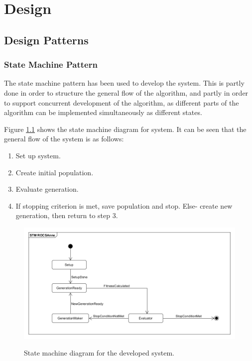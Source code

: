 
\chapter{Design}
\section{Design Patterns}
\subsection{State Machine Pattern}
The state machine pattern has been used to develop the system. This is partly done in order to structure the general flow of the algorithm, and partly in order to support concurrent development of the algorithm, as different parts of the algorithm can be implemented simultaneously as different states.

Figure \ref{fig:STM_diagram} shows the state machine diagram for system. It can be seen that the general flow of the system is as follows:
\begin{enumerate}
	\item Set up system.
	\item Create initial population.
	\item Evaluate generation.
	\item If stopping criterion is met, save population and stop. Else-  create new generation, then return to step 3.
\end{enumerate}

\begin{figure}[H]
	\centering
	{\includegraphics[width=\textwidth]{Images/STM_ROGSAnne.PNG}}\\[0.5cm]
	\caption{State machine diagram for the developed system.}
	\label{fig:STM_diagram}
\end{figure}

